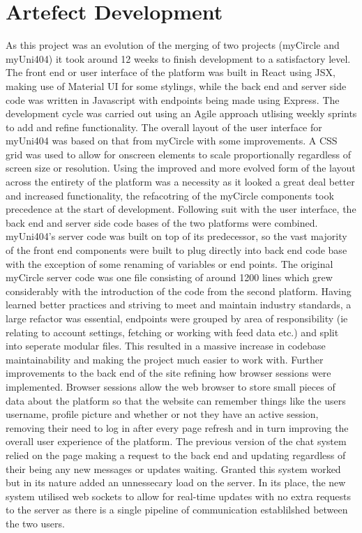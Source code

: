\documentclass[lettersize,journal]{IEEEtran}
\begin{document}
\section{Artefect Development}
	As this project was an evolution of the merging of two projects (myCircle and myUni404) it took around 12 weeks to finish development to a satisfactory level. The front end or user interface of
	the platform was built in React using JSX, making use of Material UI for some stylings, while the back end and server side code was written in Javascript with endpoints being made using
	Express. The development cycle was carried out using an Agile approach utlising weekly sprints to add and refine functionality. The overall layout of the user interface for myUni404 was based 
	on that from myCircle with some	improvements. A CSS grid was used to allow for onscreen elements to scale proportionally regardless of screen size or resolution. Using the improved and more
	evolved form of the layout across the entirety of the platform was a necessity as it looked a great deal better and increased functionality, the refacotring of the myCircle components took
	precedence at the start of development.	Following suit with the user interface, the back end and server side code bases of the two platforms were combined. myUni404's server code was built on
	top of its predecessor, so the vast majority of the front end components were built to plug directly into back end code base with the exception of some renaming of variables or end points. The
	original myCircle server code was one file consisting of around 1200 lines which grew considerably with the introduction of the code from the second platform. Having learned better practices and
	striving to meet and maintain industry standards, a large refactor was essential, endpoints were grouped by area of responsibility (ie relating to account settings, fetching or working with feed
	data etc.) and split into seperate modular files. This resulted in a massive increase in codebase maintainability and making the project much easier to work with. Further improvements to the
	back end of the site refining how browser sessions were implemented. Browser sessions allow the web browser to store small pieces of data about the platform so that the website can remember
	things like the users username, profile picture and whether or not they have an active session, removing their need to log in after every page refresh and in turn improving the overall user
	experience of the platform. The previous version of the chat system relied on the page making a request to the back end and updating regardless	of their being any new messages or updates
	waiting. Granted this system worked but in its nature added an unnessecary load on the server. In its place, the new system utilised web sockets to allow for real-time updates with no extra
	requests to the server as there is a single pipeline of communication establilshed between the two users.
\end{document}
